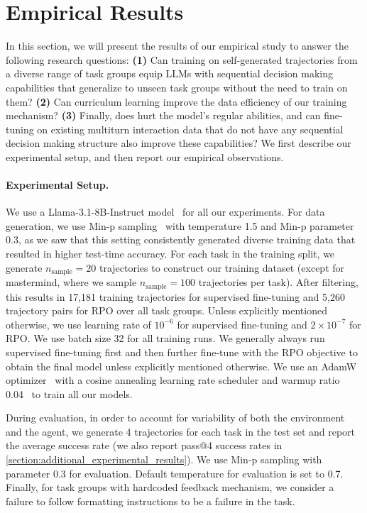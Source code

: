 

\section{Empirical Results}


In this section, we will present the results of our empirical study to answer the following research questions: \textbf{(1)} Can training on self-generated trajectories from a diverse range of task groups equip LLMs with sequential decision making capabilities that generalize to unseen task groups without the need to train on them? \textbf{(2)} Can curriculum learning improve the data efficiency of our training mechanism? \textbf{(3)} Finally, does \ours{} hurt the model's regular abilities, and can fine-tuning on existing multiturn interaction data that do not have any sequential decision making structure also improve these capabilities? We first describe our experimental setup, and then report our empirical observations.

\paragraph{Experimental Setup.}

We use a Llama-3.1-8B-Instruct model~\citep{grattafiori2024llama3herdmodels} for all our experiments. For data generation, we use Min-p sampling~\citep{nguyen2024turning} with temperature 1.5 and Min-p parameter 0.3, as we saw that this setting consistently generated diverse training data that resulted in higher test-time accuracy. For each task in the training split, we generate $n_\text{sample} = 20$ trajectories to construct our training dataset (except for mastermind, where we sample $n_{\text{sample}} = 100$ trajectories per task). After filtering, this results in 17,181 training trajectories for supervised fine-tuning and 5,260 trajectory pairs for RPO over all task groups. Unless explicitly mentioned otherwise, we use learning rate of $10^{-6}$ for supervised fine-tuning and $2 \times 10^{-7}$ for RPO. We use batch size 32 for all training runs. We generally always run supervised fine-tuning first and then further fine-tune with the RPO objective to obtain the final model unless explicitly mentioned otherwise. We use an AdamW optimizer~\citep{loshchilov2019decoupledweightdecayregularization} with a cosine annealing learning rate scheduler and warmup ratio 0.04~\citep{loshchilov2017sgdrstochasticgradientdescent} to train all our models.

During evaluation, in order to account for variability of both the environment and the agent, we generate 4 trajectories for each task in the test set and report the average success rate (we also report pass@4 success rates in \cref{section:additional_experimental_results}). We use Min-p sampling with parameter 0.3 for evaluation. Default temperature for evaluation is set to 0.7. Finally, for task groups with hardcoded feedback mechanism, we consider a failure to follow formatting instructions to be a failure in the task.


